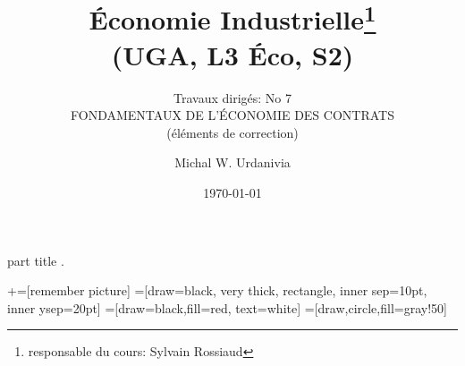 
\usepackage{color}
\usepackage{tikz}
\usetikzlibrary{shapes.geometric, arrows}
\usepackage{enumerate}   
\usepackage{multirow}
%
  \usepackage{eso-pic}

{
    \begin{centering}
    \begin{beamercolorbox}[sep=11pt,center]{part title}
    \thesection.~\insertsection\par
    \end{beamercolorbox}
    \end{centering}
}
\title[]{ \textbf{Économie Industrielle}\footnote{responsable du cours: Sylvain Rossiaud} \\ (UGA, L3 Éco, S2) \\ }
\subtitle{Travaux dirigés: No 7\\ FONDAMENTAUX DE L'ÉCONOMIE DES CONTRATS\\
(éléments de correction)}
\date{\today}
\author{Michal W. Urdanivia\inst{*}}




\usetikzlibrary{positioning}
\usetikzlibrary{snakes}
\usetikzlibrary{calc}
\usetikzlibrary{arrows}
\usetikzlibrary{decorations.markings}
\usetikzlibrary{shapes.misc}
\usetikzlibrary{matrix,shapes,arrows,fit,tikzmark}
\usetikzlibrary{shapes}
\usetikzlibrary{shapes.geometric, arrows}
\newcommand\marktopleft[1]{
    \tikz[overlay,remember picture] 
        \node (marker-#1-a) at (-.3em,.3em) {};%
}
\newcommand\markbottomright[2]{%
    \tikz[overlay,remember picture] 
        \node (marker-#1-b) at (0em,0em) {};%
}
+=[remember picture] 
 =[draw=black, very thick, rectangle, inner sep=10pt, inner ysep=20pt]
 =[draw=black,fill=red, text=white]
=[draw,circle,fill=gray!50]

